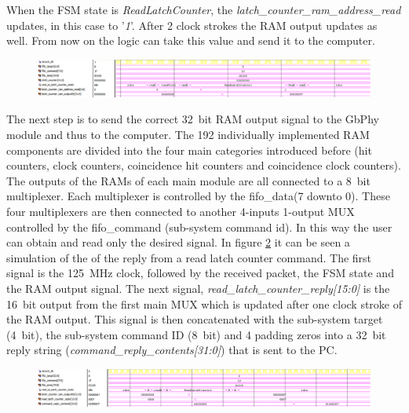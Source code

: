 \noindent When the FSM state is \textit{ReadLatchCounter}, the \textit{latch\_counter\_ram\_address\_read} updates, in this case to '\textit{1}'. After 2 clock strokes the RAM output updates as well. From now on the logic can take this value and send it to the computer. 
\begin{figure}[H]
	\centering
	\includegraphics[width=1.0\linewidth]{IMG/ch4/LATCHsimulations/READLATCH}
	\caption{}
	\label{fig:readlatch}
\end{figure}
\noindent The next step is to send the correct 32~bit RAM output signal to the GbPhy module and thus to the computer.
The 192 individually implemented RAM components are divided into the four main categories introduced before (hit counters, clock counters, coincidence hit counters and coincidence clock counters).
The outputs of the RAMs of each main module are all connected to a 8~bit multiplexer. Each multiplexer is controlled by the fifo\_data(7 downto 0). These four multiplexers are then connected to another 4-inputs 1-output MUX controlled by the fifo\_command (sub-system command id). In this way the user can obtain and read only the desired signal.
In figure \ref{fig:replylatch} it can be seen a simulation of the of the reply from a read latch counter command.
The first signal is the 125~MHz clock, followed by the received packet, the FSM state and the RAM output signal.
The next signal, \textit{read\_latch\_counter\_reply[15:0]} is the 16~bit output from the first main MUX which is updated after one clock stroke of the RAM output.
This signal is then concatenated with the sub-system target (4~bit), the sub-system command ID (8~bit) and 4 padding zeros into a 32~bit reply string (\textit{command\_reply\_contents[31:0]}) that is sent to the PC. 
\begin{figure}[H]
	\centering
	\includegraphics[width=1.0\linewidth]{IMG/ch4/LATCHsimulations/REPLYLATCH}
	\caption{}
	\label{fig:replylatch}
\end{figure}
